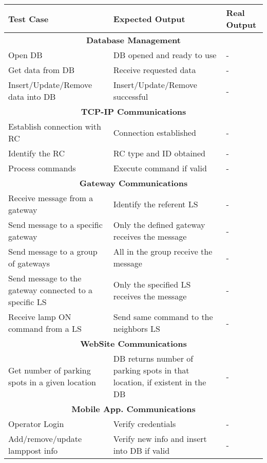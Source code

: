 \begin{table}[H]
	\centering
	\begin{threeparttable}
	\resizebox{\columnwidth}{!}
	{
		\begin{tabular}{|m{4cm}|m{5cm}||m{5cm}|}
			\hline
			\textbf{Test Case} & \textbf{Expected Output} & \textbf{Real Output}
			\\\hline\hline
			\multicolumn{3}{c}{\textbf{Database Management}}\\\hline
			Open DB & DB opened and ready to use & -
			\\\hline
			Get data from DB & Receive requested data & -
			\\\hline
			Insert/Update/Remove data into DB & Insert/Update/Remove successful & -
			\\\hline
			
			\multicolumn{3}{c}{\textbf{TCP-IP Communications}}\\\hline
			Establish connection with RC & Connection established & -
			\\\hline
			Identify the RC & RC type and ID obtained & -
			\\\hline
			Process commands & Execute command if valid & -
			\\\hline
			
			\multicolumn{3}{c}{\textbf{Gateway Communications}}\\\hline
			Receive message from a gateway & Identify the referent LS & -
			\\\hline
			Send message to a specific gateway & Only the defined gateway receives the message & - 
			\\\hline
			Send message to a group of gateways & All in the group receive the message & -
			\\\hline
			Send message to the gateway connected to a specific LS & Only the specified LS receives the message & -
			\\\hline
			Receive lamp ON command from a LS & Send same command to the neighbors LS & -
			\\\hline
			
			\multicolumn{3}{c}{\textbf{WebSite Communications}}\\\hline
			Get number of parking spots in a given location & DB returns number of parking spots in that location, if existent in the DB & -
			\\\hline
			
			\multicolumn{3}{c}{\textbf{Mobile App. Communications}}\\\hline
			Operator Login & Verify credentials & -
			\\\hline
			Add/remove/update lamppost info & Verify new info and insert into DB if valid & -
			\\\hline
		\end{tabular}
	}
	

\end{threeparttable}
\end{table}
